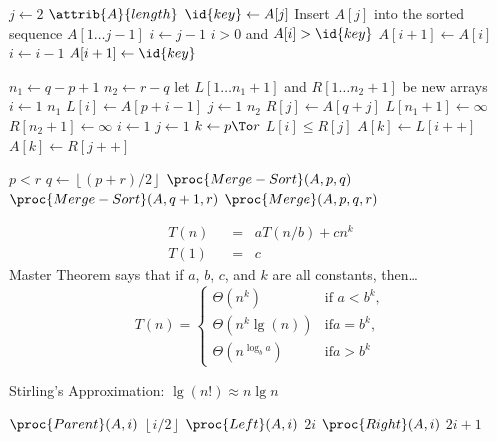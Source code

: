 \documentclass[11pt]{article}
\def\lf{\left\lfloor}
\def\rf{\right\rfloor}
\theoremstyle{definition}
\begin{document}
  
 \begin{codebox}
   \li \For \(j \gets 2\) \To \(\attrib{A}{length}\) \Do
     \li \(\id{key} \gets A[j]\)
     \li \Comment Insert \(A[j]\) into the sorted sequence \(A[1 \dots j-1]\)
     \li \(i \gets j-1\)
     \li \While \(i > 0\) and \(A[i] > \id{key}\) \Do
       \li \(A[i+1] \gets A[i]\)
       \li \(i \gets i-1\) \End
     \li \(A[i+1] \gets \id{key}\) \End
 \end{codebox}

 \begin{codebox}
   \li \(n_1 \gets q-p+1\)
   \li \(n_2 \gets r-q\)
   \li let \(L[1 \dots n_1+1]\) and \(R[1 \dots n_2+1]\) be new arrays
   \li \For \(i \gets 1\) \To \(n_1\) \Do
     \li \(L[i] \gets A[p+i-1]\) \End
   \li \For \(j \gets 1\) \To \(n_2\) \Do
     \li \(R[j] \gets A[q+j]\) \End
   \li \(L[n_1+1] \gets \infty\)
   \li \(R[n_2+1] \gets \infty\)
   \li \(i \gets 1\)
   \li \(j \gets 1\)
   \li \For \(k \gets p \To r\) \Do
     \li \If \(L[i] \leq R[j]\) \Then
       \li \(A[k] \gets L[i++]\)
     \li \Else \(A[k] \gets R[j++]\) \End \End
 \end{codebox}

\begin{codebox}
  \li \If \(p < r\) \Then
    \li \(q \gets \lf (p+r)/2 \rf\)
    \li \(\proc{Merge-Sort}(A,p,q)\)
    \li \(\proc{Merge-Sort}(A,q+1,r)\)
    \li \(\proc{Merge}(A,p,q,r)\)
\end{codebox}

\begin{align*}
  && T(n) \;\;&=\;\; aT(n/b) + cn^k && \\ 
  && T(1) \;\;&=\;\; c
\end{align*}
Master Theorem says that if \(a\), \(b\), \(c\), and \(k\) are all constants, then\dots
 \[ T(n) = \begin{cases}
   \Theta(n^k) & \text{if } a < b^k, \\
   \Theta(n^k \lg(n)) & \text{if} a = b^k, \\
   \Theta(n^{\log_b a}) & \text{if} a > b^k
   \end{cases}\]

Stirling's Approximation: \(\lg(n!) \approx n\lg n\)
\newpage
\begin{codebox}
  \(\proc{Parent}(A,i)\) \Return \(\lf i/2 \rf\) \quad
  \(\proc{Left}(A,i)\) \Return \(2i\) \quad
  \(\proc{Right}(A,i)\) \Return \(2i+1\)
\end{codebox}
\end{document}
